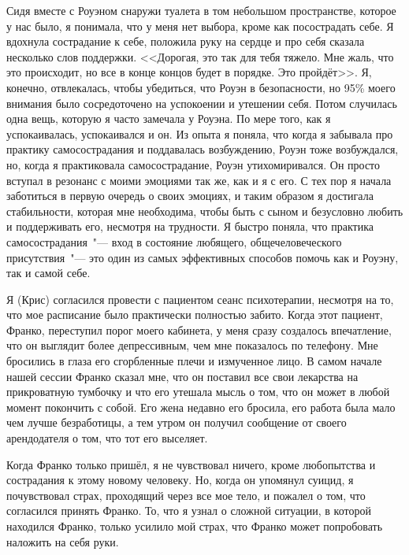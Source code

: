 Сидя вместе с Роуэном снаружи туалета в том небольшом пространстве, которое у нас было, я понимала, что у меня нет выбора, кроме как посострадать себе. Я вдохнула сострадание к себе, положила руку на сердце и про себя сказала несколько слов поддержки. <<Дорогая, это так для тебя тяжело. Мне жаль, что это происходит, но все в конце концов будет в порядке. Это пройдёт>>. Я, конечно, отвлекалась, чтобы убедиться, что Роуэн в безопасности, но 95\% моего внимания было сосредоточено на успокоении и утешении себя. Потом случилась одна вещь, которую я часто замечала у Роуэна. По мере того, как я успокаивалась, успокаивался и он. Из опыта я поняла, что когда я забывала про практику самосострадания и поддавалась возбуждению, Роуэн тоже возбуждался, но, когда я практиковала самосострадание, Роуэн утихомиривался. Он просто вступал в резонанс с моими эмоциями так же, как и я с его. С тех пор я начала заботиться в первую очередь о своих эмоциях, и таким образом я достигала стабильности, которая мне необходима, чтобы быть с сыном и безусловно любить и поддерживать его, несмотря на трудности. Я быстро поняла, что практика самосострадания~"--- вход в состояние любящего, общечеловеческого присутствия~"--- это один из самых эффективных способов помочь как и Роуэну, так и самой себе.

Я (Крис) согласился провести с пациентом сеанс психотерапии, несмотря на то, что мое расписание было практически полностью забито. Когда этот пациент, Франко, переступил порог моего кабинета, у меня сразу создалось впечатление, что он выглядит более депрессивным, чем мне показалось по телефону. Мне бросились в глаза его сгорбленные плечи и измученное лицо. В самом начале нашей сессии Франко сказал мне, что он поставил все свои лекарства на прикроватную тумбочку и что его утешала мысль о том, что он может в любой момент покончить с собой. Его жена недавно его бросила, его работа была мало чем лучше безработицы, а тем утром он получил сообщение от своего арендодателя о том, что тот его выселяет.

Когда Франко только пришёл, я не чувствовал ничего, кроме любопытства и сострадания к этому новому человеку. Но, когда он упомянул суицид, я почувствовал страх, проходящий через все мое тело, и пожалел о том, что согласился принять Франко. То, что я узнал о сложной ситуации, в которой находился Франко, только усилило мой страх, что Франко может попробовать наложить на себя руки.

